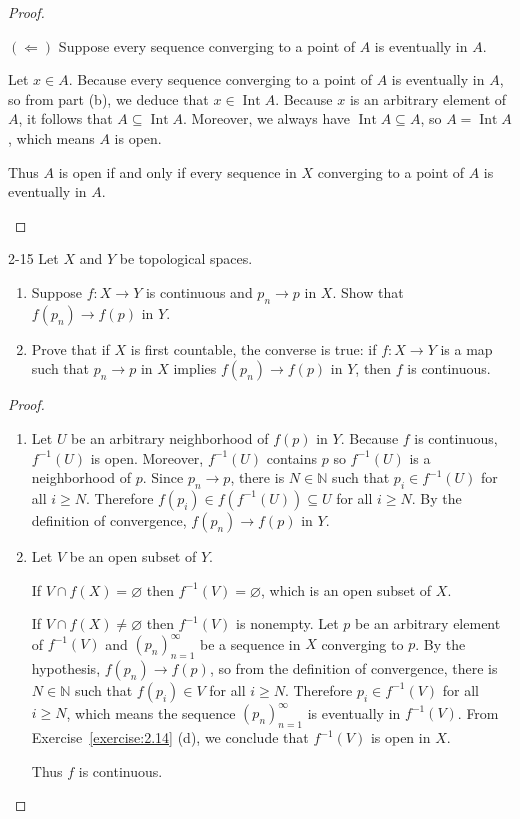 \begin{proof}
\begin{enumerate}[label={(\alph*)}]
		      $(\Leftarrow)$ Suppose every sequence converging to a point of $A$ is eventually in $A$.

		      Let $x\in A$. Because every sequence converging to a point of $A$ is eventually in $A$, so from part (b), we deduce that $x\in \operatorname{Int}A$. Because $x$ is an arbitrary element of $A$, it follows that $A\subseteq\operatorname{Int}A$. Moreover, we always have $\operatorname{Int}A\subseteq A$, so $A = \operatorname{Int}A$, which means $A$ is open.

		      Thus $A$ is open if and only if every sequence in $X$ converging to a point of $A$ is eventually in $A$.
	\end{enumerate}
\end{proof}

\begin{problem}{2-15}
Let $X$ and $Y$ be topological spaces.
\begin{enumerate}[label={(\alph*)}]
	\item Suppose $f: X\to Y$ is continuous and $p_{n}\to p$ in $X$. Show that $f(p_{n})\to f(p)$ in $Y$.
	\item Prove that if $X$ is first countable, the converse is true: if $f: X\to Y$ is a map such that $p_{n}\to p$ in $X$ implies $f(p_{n})\to f(p)$ in $Y$, then $f$ is continuous.
\end{enumerate}
\end{problem}

\begin{proof}
	\begin{enumerate}[label={(\alph*)}]
		\item Let $U$ be an arbitrary neighborhood of $f(p)$ in $Y$. Because $f$ is continuous, $f^{-1}(U)$ is open. Moreover, $f^{-1}(U)$ contains $p$ so $f^{-1}(U)$ is a neighborhood of $p$. Since $p_{n}\to p$, there is $N\in\mathbb{N}$ such that $p_{i}\in f^{-1}(U)$ for all $i\geq N$. Therefore $f(p_{i})\in f(f^{-1}(U))\subseteq U$ for all $i\geq N$. By the definition of convergence, $f(p_{n})\to f(p)$ in $Y$.
		\item Let $V$ be an open subset of $Y$.

		      If $V\cap f(X) = \varnothing$ then $f^{-1}(V) = \varnothing$, which is an open subset of $X$.

		      If $V\cap f(X) \ne \varnothing$ then $f^{-1}(V)$ is nonempty. Let $p$ be an arbitrary element of $f^{-1}(V)$ and ${(p_{n})}^{\infty}_{n=1}$ be a sequence in $X$ converging to $p$. By the hypothesis, $f(p_{n})\to f(p)$, so from the definition of convergence, there is $N\in\mathbb{N}$ such that $f(p_{i})\in V$ for all $i\geq N$. Therefore $p_{i}\in f^{-1}(V)$ for all $i\geq N$, which means the sequence ${(p_{n})}^{\infty}_{n=1}$ is eventually in $f^{-1}(V)$. From Exercise~\ref{exercise:2.14} (d), we conclude that $f^{-1}(V)$ is open in $X$.

		      Thus $f$ is continuous.
	\end{enumerate}
\end{proof}

